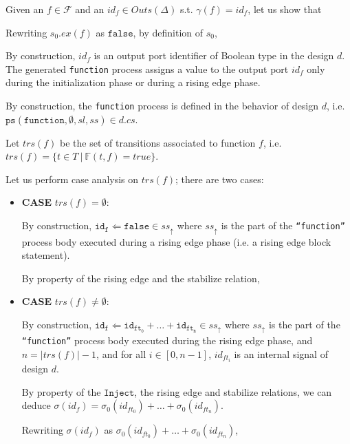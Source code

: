 \documentclass[dvipsnames,12pt]{article}
\begin{document}
\begin{niproof}
  Given an $f\in\mathcal{F}$ and an $id_f\in{}Outs(\Delta)$
  s.t. $\gamma(f)=id_f$, let us show that

  Rewriting $s_0.ex(f)$ as $\mathtt{false}$, by definition of $s_0$,

  By construction, $id_f$ is an output port identifier of Boolean type
  in the \hvhdl{} design $d$. The generated \texttt{function} process
  assigns a value to the output port $id_f$ only during the
  initialization phase or during a rising edge phase.
  
  By construction, the \texttt{function} process is defined in the
  behavior of design $d$, i.e.\\
  $\mathtt{ps}(\texttt{function}, \emptyset, sl, ss)\in{}d.cs$.
  
  Let $trs(f)$ be the set of transitions associated to function $f$,
  i.e. $trs(f)=\{t\in{}T~\vert~\mathbb{F}(t,f)=true\}$.

  Let us perform case analysis on $trs(f)$; there are two cases:
  
  \begin{itemize}
  \item \textbf{CASE} $trs(f)=\emptyset$:
    
    By construction,
    $\mathtt{id_f\Leftarrow{}false}\in{}ss_{\uparrow}$ where
    $ss_\uparrow$ is the part of the \texttt{``function''} process
    body executed during a rising edge phase (i.e. a rising edge block
    statement).

    By property of the \hvhdl{} rising edge and the stabilize
    relation, 
    
  \item \textbf{CASE} $trs(f)\neq\emptyset$:
    
    By construction,
    $\mathtt{id_f\Leftarrow{}id_{ft_0}+\dots+id_{ft_n}}\in{}ss_\uparrow$
    where $ss_\uparrow$ is the part of the \texttt{``function''}
    process body executed during the rising edge phase, and
    $n=\vert{}trs(f)\vert-1$, and for all $i\in[0,n-1]$, $id_{ft_i}$
    is an internal signal of design $d$.

    By property of the $\mathtt{Inject}$, the \hvhdl{} rising
    edge and stabilize relations, we can deduce
    $\sigma(id_f)=\sigma_0(id_{ft_0})+\dots+\sigma_0(id_{ft_n})$.

    Rewriting $\sigma(id_f)$ as
    $\sigma_0(id_{ft_0})+\dots+\sigma_0(id_{ft_n})$,


\end{itemize}
\end{niproof}
\end{document}
